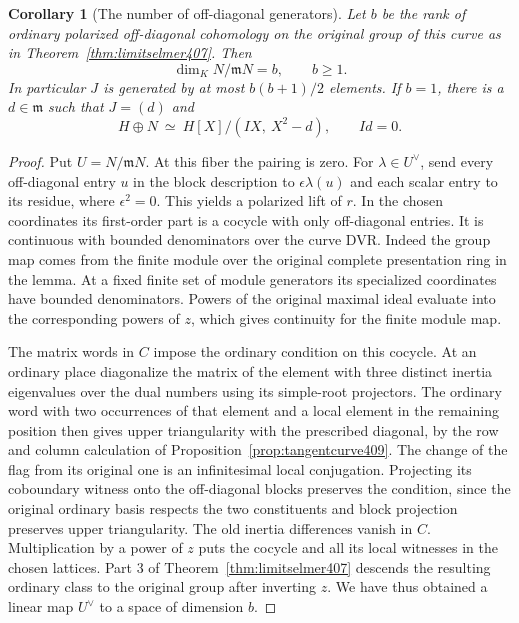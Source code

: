 \documentclass[a4paper,11pt]{article}
\newtheorem{corollary}[proposition]{Corollary}
\theoremstyle{definition}
\theoremstyle{remark}
\numberwithin{equation}{section}
\begin{document}
\begin{corollary}[The number of off-diagonal generators]\leavevmode
\label{cor:selmergenerators410}
Let \(b\) be the rank of ordinary polarized off-diagonal
cohomology on the original group of this curve as in
Theorem~\ref{thm:limitselmer407}. Then
\[
               \dim_K N/\mathfrak m N=b,\qquad b\ge1 .
\]
In particular \(J\) is generated by at most \(b(b+1)/2\)
elements. If \(b=1\), there is a \(d\in\mathfrak m\)
such that \(J=(d)\) and
\[
             H\oplus N\ \simeq\ H[X]/(IX,\ X^2-d),
             \qquad I d=0 .
\]
\end{corollary}
\begin{proof}
Put \(U=N/\mathfrak m N\). At this fiber the pairing is
zero. For \(\lambda\in U^\vee\), send every off-diagonal
entry \(u\) in the block description to \(\epsilon\lambda(u)\)
and each scalar entry to its residue, where \(\epsilon^2=0\).
This yields a polarized lift of \(r\). In the chosen coordinates
its first-order part is a cocycle with only off-diagonal
entries. It is continuous with bounded denominators over the
curve DVR. Indeed the group map comes from the finite module
over the original complete presentation ring in the lemma.
At a fixed finite set of module generators its specialized
coordinates have bounded denominators. Powers of the original
maximal ideal evaluate into the corresponding powers of
\(z\), which gives continuity for the finite module map.

The matrix words in \(C\) impose the ordinary condition on
this cocycle. At an ordinary place diagonalize the matrix of
the element with three distinct inertia eigenvalues over the
dual numbers using its simple-root projectors. The ordinary
word with two occurrences of that element and a local element
in the remaining position then gives upper triangularity with
the prescribed diagonal, by the row and column calculation
of Proposition~\ref{prop:tangentcurve409}. The change of
the flag from its original one is an infinitesimal local
conjugation. Projecting its coboundary witness onto the
off-diagonal blocks preserves the condition, since the
original ordinary basis respects the two constituents and
block projection preserves upper triangularity. The old
inertia differences vanish in \(C\). Multiplication by a
power of \(z\) puts the cocycle and all its local witnesses
in the chosen lattices. Part 3 of
Theorem~\ref{thm:limitselmer407} descends the resulting
ordinary class to the original group after inverting \(z\).
We have thus obtained a linear map \(U^\vee\) to a space
of dimension \(b\).


\end{proof}
\end{document}

